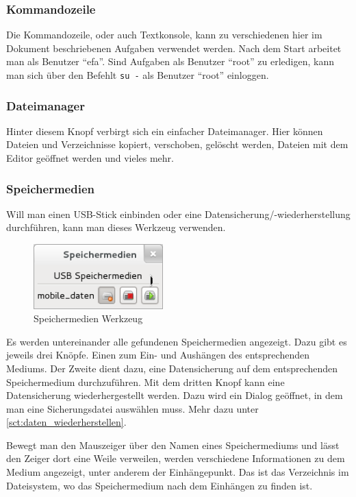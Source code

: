 \documentclass[a4paper,12pt,twoside]{article}
\begin{document}
\subsubsection{Kommandozeile}
\label{sct:kommandozeile}
Die Kommandozeile, oder auch Textkonsole, kann zu verschiedenen hier im
Dokument beschriebenen Aufgaben verwendet werden. Nach dem Start
arbeitet man als Benutzer "`efa"'. Sind
Aufgaben als Benutzer "`root"' zu erledigen,
kann man sich über den Befehlt \texttt{su -} als
Benutzer "`root"' einloggen.


\subsubsection{Dateimanager}
\label{sct:dateimanager}
Hinter diesem Knopf verbirgt sich ein einfacher Dateimanager. Hier
können Dateien und Verzeichnisse kopiert, verschoben, gelöscht werden,
Dateien mit dem Editor geöffnet werden und vieles mehr.


\subsubsection{Speichermedien}
\label{sct:dialog_speichermedien}
Will man einen USB-Stick einbinden
oder eine Datensicherung/-wiederherstellung durchführen, kann man
dieses Werkzeug verwenden.

\begin{figure}
    \centering
    \includegraphics[width=5cm]{screenshots/efaLivede-img20.png}
    \caption{Speichermedien Werkzeug}
    \label{fig:dialog_speichermedien}
\end{figure}

Es werden untereinander alle gefundenen Speichermedien angezeigt. Dazu
gibt es jeweils drei Knöpfe. Einen zum Ein- und Aushängen des
entsprechenden Mediums. Der Zweite dient dazu, eine Datensicherung auf
dem entsprechenden Speichermedium durchzuführen. Mit dem dritten Knopf
kann eine Datensicherung wiederhergestellt werden. Dazu wird ein Dialog
geöffnet, in dem man eine Sicherungsdatei auswählen muss. Mehr dazu unter
\ref{sct:daten_wiederherstellen}.

Bewegt man den Mauszeiger über den Namen eines Speichermediums und lässt
den Zeiger dort eine Weile verweilen, werden verschiedene Informationen
zu dem Medium angezeigt, unter anderem der Einhängepunkt. Das ist das
Verzeichnis im Dateisystem, wo das Speichermedium nach dem Einhängen zu
finden ist.
\end{document}
